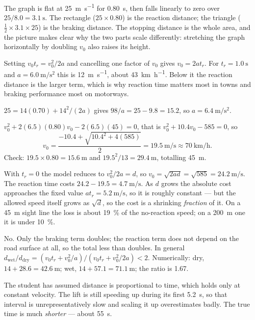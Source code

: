\documentclass[11pt,twoside,openany]{book}
\begin{document}
\begin{description}[leftmargin=2.6em,itemsep=3pt,style=sameline]
  \item[2.53] The graph is flat at \SI{25}{\metre\per\second} for \SI{0.80}{\second}, then falls linearly to zero over $25/8.0 = \SI{3.1}{\second}$. The rectangle ($25 \times 0.80$) is the reaction distance; the triangle ($\tfrac12 \times 3.1 \times 25$) is the braking distance. The stopping distance is the whole area, and the picture makes clear why the two parts scale differently: stretching the graph horizontally by doubling $v_0$ also raises its height.
  \item[2.54] Setting $v_0 t_r = v_0^2/2a$ and cancelling one factor of $v_0$ gives $v_0 = 2at_r$. For $t_r = \SI{1.0}{\second}$ and $a = \SI{6.0}{\metre\per\second\squared}$ this is \SI{12}{\metre\per\second}, about \SI{43}{\kilo\metre\per\hour}. Below it the reaction distance is the larger term, which is why reaction time matters most in towns and braking performance most on motorways.
  \item[2.55] $25 = 14(0.70) + 14^2/(2a)$ gives $98/a = 25 - 9.8 = \num{15.2}$, so $a = \SI{6.4}{\metre\per\second\squared}$.
  \item[2.56] $v_0^2 + 2(6.5)(0.80)v_0 - 2(6.5)(45) = 0$, that is $v_0^2 + 10.4 v_0 - 585 = 0$, so
  \[
  v_0 = \frac{-10.4 + \sqrt{10.4^2 + 4(585)}}{2} = \SI{19.5}{\metre\per\second} \approx \SI{70}{\kilo\metre\per\hour}.
  \]
  Check: $19.5 \times 0.80 = \SI{15.6}{\metre}$ and $19.5^2/13 = \SI{29.4}{\metre}$, totalling \SI{45}{\metre}.
  \item[2.57] With $t_r = 0$ the model reduces to $v_0^2/2a = d$, so $v_0 = \sqrt{2ad} = \sqrt{585} = \SI{24.2}{\metre\per\second}$. The reaction time costs $24.2 - 19.5 = \SI{4.7}{\metre\per\second}$. As $d$ grows the absolute cost approaches the fixed value $at_r = \SI{5.2}{\metre\per\second}$, so it is roughly constant --- but the allowed speed itself grows as $\sqrt{d}$, so the cost is a shrinking \emph{fraction} of it. On a \SI{45}{\metre} sight line the loss is about \SI{19}{\percent} of the no-reaction speed; on a \SI{200}{\metre} one it is under \SI{10}{\percent}.
  \item[2.58] No. Only the braking term doubles; the reaction term does not depend on the road surface at all, so the total less than doubles. In general $d_{\text{wet}}/d_{\text{dry}} = (v_0t_r + v_0^2/a)/(v_0t_r + v_0^2/2a) < 2$. Numerically: dry, $14 + 28.6 = \SI{42.6}{\metre}$; wet, $14 + 57.1 = \SI{71.1}{\metre}$; the ratio is \num{1.67}.
  \item[2.59] The student has assumed distance is proportional to time, which holds only at constant velocity. The lift is still speeding up during its first \SI{5.2}{\second}, so that interval is unrepresentatively slow and scaling it up overestimates badly. The true time is much \emph{shorter} --- about \SI{55}{\second}.

\end{description}
\end{document}
